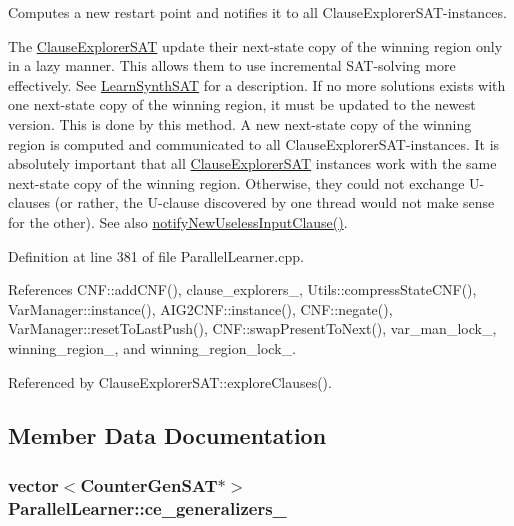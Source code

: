 Computes a new restart point and notifies it to all Clause\-Explorer\-S\-A\-T-\/instances. 

The \hyperlink{classClauseExplorerSAT}{Clause\-Explorer\-S\-A\-T} update their next-\/state copy of the winning region only in a lazy manner. This allows them to use incremental S\-A\-T-\/solving more effectively. See \hyperlink{classLearnSynthSAT}{Learn\-Synth\-S\-A\-T} for a description. If no more solutions exists with one next-\/state copy of the winning region, it must be updated to the newest version. This is done by this method. A new next-\/state copy of the winning region is computed and communicated to all Clause\-Explorer\-S\-A\-T-\/instances. It is absolutely important that all \hyperlink{classClauseExplorerSAT}{Clause\-Explorer\-S\-A\-T} instances work with the same next-\/state copy of the winning region. Otherwise, they could not exchange U-\/clauses (or rather, the U-\/clause discovered by one thread would not make sense for the other). See also \hyperlink{classParallelLearner_a0a8405e4fb7331f3f3df2711fdaebdab}{notify\-New\-Useless\-Input\-Clause()}. 

Definition at line 381 of file Parallel\-Learner.\-cpp.



References C\-N\-F\-::add\-C\-N\-F(), clause\-\_\-explorers\-\_\-, Utils\-::compress\-State\-C\-N\-F(), Var\-Manager\-::instance(), A\-I\-G2\-C\-N\-F\-::instance(), C\-N\-F\-::negate(), Var\-Manager\-::reset\-To\-Last\-Push(), C\-N\-F\-::swap\-Present\-To\-Next(), var\-\_\-man\-\_\-lock\-\_\-, winning\-\_\-region\-\_\-, and winning\-\_\-region\-\_\-lock\-\_\-.



Referenced by Clause\-Explorer\-S\-A\-T\-::explore\-Clauses().



\subsection{Member Data Documentation}
\hypertarget{classParallelLearner_a46cc16764d7ea8ffafe8d1b696c35df3}{
\subsubsection[{ce\-\_\-generalizers\-\_\-}]{\setlength{\rightskip}{0pt plus 5cm}vector$<${\bf Counter\-Gen\-S\-A\-T}$\ast$$>$ Parallel\-Learner\-::ce\-\_\-generalizers\-\_\-\hspace{0.3cm}{\ttfamily [protected]}}}\label{classParallelLearner_a46cc16764d7ea8ffafe8d1b696c35df3}


